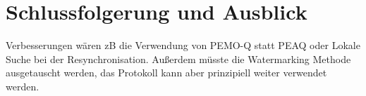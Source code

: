 \chapter{Schlussfolgerung und Ausblick}
\label{ch:ausblick}

Verbesserungen wären zB die Verwendung von PEMO-Q\cite{huber2006pemo} statt PEAQ oder Lokale Suche bei der Resynchronisation. Außerdem müsste die Watermarking Methode ausgetauscht werden, das Protokoll kann aber prinzipiell weiter verwendet werden.

